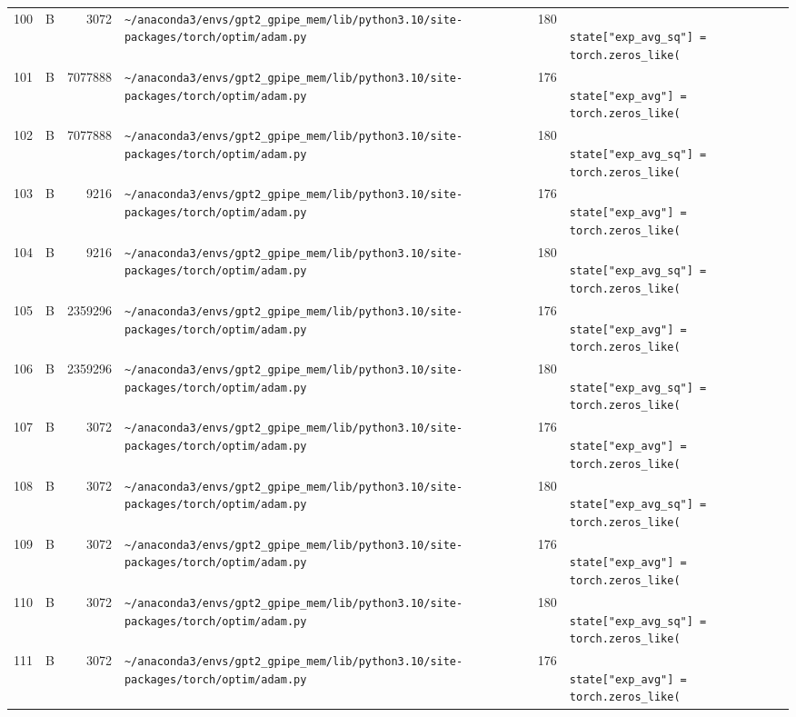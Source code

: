 \documentclass{article}
\begin{document}
\begin{longtable}{r l r p{6.5cm} r p{7.0cm}}
100 & B & 3072 & \lstinline|~/anaconda3/envs/gpt2_gpipe_mem/lib/python3.10/site-packages/torch/optim/adam.py| & 180 & \lstinline|                    state["exp_avg_sq"] = torch.zeros_like(| \\
101 & B & 7077888 & \lstinline|~/anaconda3/envs/gpt2_gpipe_mem/lib/python3.10/site-packages/torch/optim/adam.py| & 176 & \lstinline|                    state["exp_avg"] = torch.zeros_like(| \\
102 & B & 7077888 & \lstinline|~/anaconda3/envs/gpt2_gpipe_mem/lib/python3.10/site-packages/torch/optim/adam.py| & 180 & \lstinline|                    state["exp_avg_sq"] = torch.zeros_like(| \\
103 & B & 9216 & \lstinline|~/anaconda3/envs/gpt2_gpipe_mem/lib/python3.10/site-packages/torch/optim/adam.py| & 176 & \lstinline|                    state["exp_avg"] = torch.zeros_like(| \\
104 & B & 9216 & \lstinline|~/anaconda3/envs/gpt2_gpipe_mem/lib/python3.10/site-packages/torch/optim/adam.py| & 180 & \lstinline|                    state["exp_avg_sq"] = torch.zeros_like(| \\
105 & B & 2359296 & \lstinline|~/anaconda3/envs/gpt2_gpipe_mem/lib/python3.10/site-packages/torch/optim/adam.py| & 176 & \lstinline|                    state["exp_avg"] = torch.zeros_like(| \\
106 & B & 2359296 & \lstinline|~/anaconda3/envs/gpt2_gpipe_mem/lib/python3.10/site-packages/torch/optim/adam.py| & 180 & \lstinline|                    state["exp_avg_sq"] = torch.zeros_like(| \\
107 & B & 3072 & \lstinline|~/anaconda3/envs/gpt2_gpipe_mem/lib/python3.10/site-packages/torch/optim/adam.py| & 176 & \lstinline|                    state["exp_avg"] = torch.zeros_like(| \\
108 & B & 3072 & \lstinline|~/anaconda3/envs/gpt2_gpipe_mem/lib/python3.10/site-packages/torch/optim/adam.py| & 180 & \lstinline|                    state["exp_avg_sq"] = torch.zeros_like(| \\
109 & B & 3072 & \lstinline|~/anaconda3/envs/gpt2_gpipe_mem/lib/python3.10/site-packages/torch/optim/adam.py| & 176 & \lstinline|                    state["exp_avg"] = torch.zeros_like(| \\
110 & B & 3072 & \lstinline|~/anaconda3/envs/gpt2_gpipe_mem/lib/python3.10/site-packages/torch/optim/adam.py| & 180 & \lstinline|                    state["exp_avg_sq"] = torch.zeros_like(| \\
111 & B & 3072 & \lstinline|~/anaconda3/envs/gpt2_gpipe_mem/lib/python3.10/site-packages/torch/optim/adam.py| & 176 & \lstinline|                    state["exp_avg"] = torch.zeros_like(| \\

\end{longtable}
\end{document}

